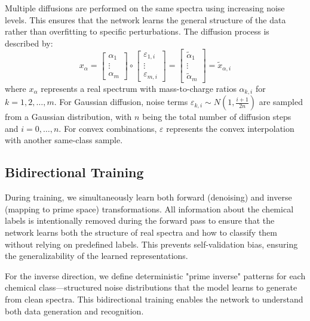 \documentclass[sigconf]{acmart}
\begin{document}
Multiple diffusions are performed on the same spectra using increasing noise levels. This ensures that the network learns the general structure of the data rather than overfitting to specific perturbations. The diffusion process is described by:
\begin{equation}
    x_\alpha = \begin{bmatrix}
        \alpha_1\\
        \vdots\\
        \alpha_m
    \end{bmatrix} \circ 
    \begin{bmatrix}
        \varepsilon_{1,i}\\
        \vdots\\
        \varepsilon_{m,i}
    \end{bmatrix} = 
    \begin{bmatrix}
        \tilde \alpha_1\\
        \vdots\\
        \tilde \alpha_m
    \end{bmatrix} = \tilde x_{\alpha, i}
\end{equation}
where $x_\alpha$ represents a real spectrum with mass-to-charge ratios $\alpha_{k,i}$ for $k = 1, 2, \dots, m$. For Gaussian diffusion, noise terms $\varepsilon_{k,i} \sim N(1, \frac{i+1}{2n})$ are sampled from a Gaussian distribution, with $n$ being the total number of diffusion steps and $i = 0, \dots, n$. For convex combinations, $\varepsilon$ represents the convex interpolation with another same-class sample.

\subsection{Bidirectional Training}

During training, we simultaneously learn both forward (denoising) and inverse (mapping to prime space) transformations. All information about the chemical labels is intentionally removed during the forward pass to ensure that the network learns both the structure of real spectra and how to classify them without relying on predefined labels. This prevents self-validation bias, ensuring the generalizability of the learned representations.

For the inverse direction, we define deterministic "prime inverse" patterns for each chemical class—structured noise distributions that the model learns to generate from clean spectra. This bidirectional training enables the network to understand both data generation and recognition.
\end{document}
